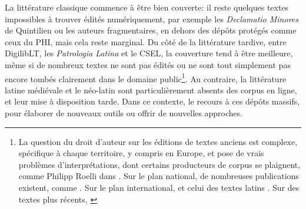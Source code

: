 La littérature classique commence à être bien couverte: il reste quelques textes impossibles à trouver édités numériquement, par exemple les \textit{Declamatio Minores} de Quintilien ou les auteurs fragmentaires, en dehors des dépôts protégés comme ceux du PHI, mais cela reste marginal. Du côté de la littérature tardive, entre DigilibLT, les \textit{Patrologia Latina} et le CSEL, la couverture tend à être meilleure, même si de nombreux textes ne sont pas édités ou ne sont tout simplement pas encore tombés clairement dans le domaine public\footnote{La question du droit d'auteur sur les éditions de textes anciens est complexe, spécifique à chaque territoire, y compris en Europe, et pose de vrais problèmes d'interprétations, dont certains producteurs de corpus se plaignent, comme Philipp Roelli dans \cite{roelli2014corpus}. Sur le plan national, de nombreuses publications existent, comme \cite{combalbert_lediteur_2015, demonet_confiscation_2018}. Sur le plan international, et celui des textes latins \cite{fischer2017digital, dillen_digital_2016}. Sur des textes plus récents, \cite{dusollier_international_2019}}. Au contraire, la littérature latine médiévale et le néo-latin sont particulièrement absents des corpus en ligne, et leur mise à disposition tarde. Dans ce contexte, le recours à ces dépôts massifs, pour élaborer de nouveaux outils ou offrir de nouvelles approches.

